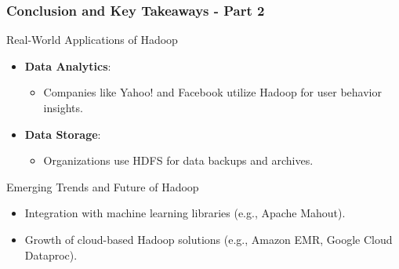 \documentclass[aspectratio=169]{beamer}
\begin{document}
\begin{frame}[fragile]
    \frametitle{Conclusion and Key Takeaways - Part 2}
    \begin{block}{Real-World Applications of Hadoop}
        \begin{itemize}
            \item \textbf{Data Analytics}: 
                \begin{itemize}
                    \item Companies like Yahoo! and Facebook utilize Hadoop for user behavior insights.
                \end{itemize}
            \item \textbf{Data Storage}:
                \begin{itemize}
                    \item Organizations use HDFS for data backups and archives.
                \end{itemize}
        \end{itemize}
    \end{block}
    
    \begin{block}{Emerging Trends and Future of Hadoop}
        \begin{itemize}
            \item Integration with machine learning libraries (e.g., Apache Mahout).
            \item Growth of cloud-based Hadoop solutions (e.g., Amazon EMR, Google Cloud Dataproc).
        \end{itemize}
    \end{block}
\end{frame}
\end{document}
